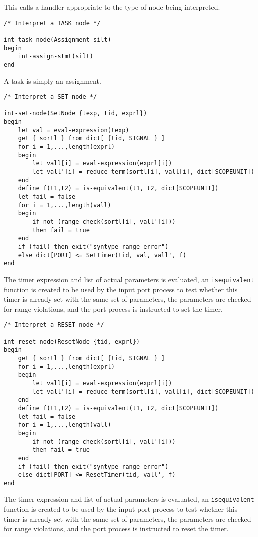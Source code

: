 This calls a handler appropriate to the type of node being
interpreted.

\begin{verbatim}
/* Interpret a TASK node */

int-task-node(Assignment silt)
begin
    int-assign-stmt(silt)
end
\end{verbatim}

A task is simply an assignment.

\begin{verbatim}
/* Interpret a SET node */

int-set-node(SetNode {texp, tid, exprl})
begin
    let val = eval-expression(texp)
    get { sortl } from dict[ {tid, SIGNAL } ]
    for i = 1,...,length(exprl)
    begin
	    let vall[i] = eval-expression(exprl[i])
	    let vall'[i] = reduce-term(sortl[i], vall[i], dict[SCOPEUNIT])
    end
    define f(t1,t2) = is-equivalent(t1, t2, dict[SCOPEUNIT])
    let fail = false
    for i = 1,...,length(vall)
    begin
        if not (range-check(sortl[i], vall'[i]))
        then fail = true
    end
    if (fail) then exit("syntype range error")
    else dict[PORT] <= SetTimer(tid, val, vall', f)
end
\end{verbatim}

The timer expression and list of actual parameters is evaluated,
an {\tt isequivalent} function is created to be used by the input
port process to test whether this timer is already set with the same
set of parameters, the parameters are checked for range violations,
and the port process is instructed to set the timer.

\begin{verbatim}
/* Interpret a RESET node */

int-reset-node(ResetNode {tid, exprl})
begin
    get { sortl } from dict[ {tid, SIGNAL } ]
    for i = 1,...,length(exprl)
    begin
	    let vall[i] = eval-expression(exprl[i])
	    let vall'[i] = reduce-term(sortl[i], vall[i], dict[SCOPEUNIT])
    end
    define f(t1,t2) = is-equivalent(t1, t2, dict[SCOPEUNIT])
    let fail = false
    for i = 1,...,length(vall)
    begin
        if not (range-check(sortl[i], vall'[i]))
        then fail = true
    end
    if (fail) then exit("syntype range error")
    else dict[PORT] <= ResetTimer(tid, vall', f)
end
\end{verbatim}

The timer expression and list of actual parameters is evaluated,
an {\tt isequivalent} function is created to be used by the input
port process to test whether this timer is already set with the same
set of parameters, the parameters are checked for range violations,
and the port process is instructed to reset the timer.

